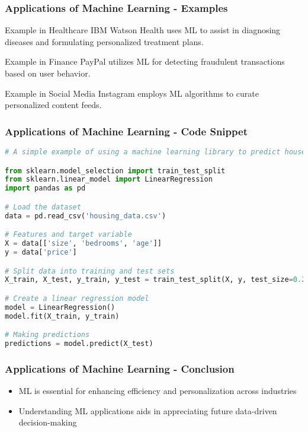 \documentclass[aspectratio=169]{beamer}
\begin{document}
\begin{frame}[fragile]
    \frametitle{Applications of Machine Learning - Examples}
    \begin{block}{Example in Healthcare}
        IBM Watson Health uses ML to assist in diagnosing diseases and formulating personalized treatment plans.
    \end{block}
    \begin{block}{Example in Finance}
        PayPal utilizes ML for detecting fraudulent transactions based on user behavior.
    \end{block}
    \begin{block}{Example in Social Media}
        Instagram employs ML algorithms to curate personalized content feeds.
    \end{block}
\end{frame}

\begin{frame}[fragile]
    \frametitle{Applications of Machine Learning - Code Snippet}
    \begin{lstlisting}[language=Python]
# A simple example of using a machine learning library to predict house prices

from sklearn.model_selection import train_test_split
from sklearn.linear_model import LinearRegression
import pandas as pd

# Load the dataset
data = pd.read_csv('housing_data.csv')

# Features and target variable
X = data[['size', 'bedrooms', 'age']]
y = data['price']

# Split data into training and test sets
X_train, X_test, y_train, y_test = train_test_split(X, y, test_size=0.2, random_state=42)

# Create a linear regression model
model = LinearRegression()
model.fit(X_train, y_train)

# Making predictions
predictions = model.predict(X_test)
    \end{lstlisting}
\end{frame}

\begin{frame}[fragile]
    \frametitle{Applications of Machine Learning - Conclusion}
    \begin{itemize}
        \item ML is essential for enhancing efficiency and personalization across industries
        \item Understanding ML applications aids in appreciating future data-driven decision-making
    \end{itemize}
\end{frame}
\end{document}
